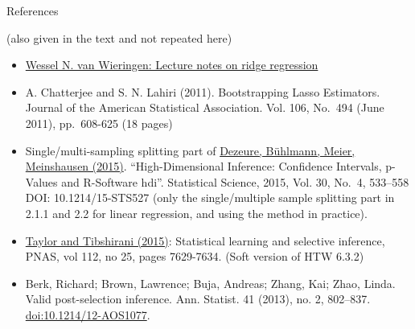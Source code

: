 \documentclass[
  ignorenonframetext,
]{beamer}
\providecommand{\tightlist}{%
  \setlength{\itemsep}{0pt}\setlength{\parskip}{0pt}}
\begin{document}
\begin{frame}{References}
\protect\hypertarget{references}{}

(also given in the text and not repeated here)

\begin{itemize}
\tightlist
\item
  \href{https://arxiv.org/pdf/1509.09169.pdf}{Wessel N. van Wieringen:
  Lecture notes on ridge regression}
\item
  A. Chatterjee and S. N. Lahiri (2011). Bootstrapping Lasso Estimators.
  Journal of the American Statistical Association. Vol. 106, No.~494
  (June 2011), pp.~608-625 (18 pages)
\item
  Single/multi-sampling splitting part of
  \href{https://projecteuclid.org/download/pdfview_1/euclid.ss/1449670857}{Dezeure,
  Bühlmann, Meier, Meinshausen (2015)}. ``High-Dimensional Inference:
  Confidence Intervals, p-Values and R-Software hdi''. Statistical
  Science, 2015, Vol. 30, No.~4, 533--558 DOI: 10.1214/15-STS527 (only
  the single/multiple sample splitting part in 2.1.1 and 2.2 for linear
  regression, and using the method in practice).
\item
  \href{https://www.pnas.org/content/112/25/7629}{Taylor and Tibshirani
  (2015)}: Statistical learning and selective inference, PNAS, vol 112,
  no 25, pages 7629-7634. (Soft version of HTW 6.3.2)
\item
  Berk, Richard; Brown, Lawrence; Buja, Andreas; Zhang, Kai; Zhao,
  Linda. Valid post-selection inference. Ann. Statist. 41 (2013), no. 2,
  802--837. \url{doi:10.1214/12-AOS1077}.
\end{itemize}

\end{frame}
\end{document}
